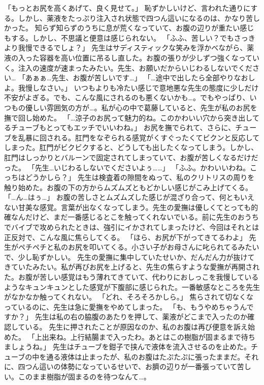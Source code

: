 「もっとお尻を高くあげて、良く見せて。」
恥ずかしいけど、言われた通りにする。しかし、薬液をたっぷり注入され状態で四つん這いになるのは、かなり苦しかった。
知らず知らずのうちに息が荒くなっていて、お腹の辺りが重たい感じもする。しかし、不思議と便意は感じられない。
「ふふ、苦しい？でもさっきより我慢できるでしょ？」
先生はサディスティックな笑みを浮かべながら、薬液の入った容器を高い位置に吊るし直した。お腹の張りが少しずつ強くなっていく。注入の速度が速まったみたい。先生、お願いだからいじわるしないでください…
「あぁぁ…先生、お腹が苦しいです…」
「…途中で出したら全部やりなおしよ。我慢しなさい。」
いつもよりも冷たい感じで意地悪な先生の態度に少しだけ不安がよぎる。でも、こんな風にされるのも悪くないかも…。でもやっぱり、いつもの優しい雰囲気の方が…。私が心の中で葛藤していると、先生が私のお尻を撫で回し始めた。
「…涼子のお尻って魅力的ね。このかわいい穴から突き出してるチューブもとってもエッチでいいわね。」
お尻を撫でられて、さらに、チューブを乱暴に回される。肛門をなぞられる感覚がくすぐったくてビクンと反応してしまった。肛門がビクビクすると、どうしても出したくなってしまう。しかし、肛門はしっかりとバルーンで固定されてしまっていて、お腹が苦しくなるだけだった。
「先生…いじわるしないでくださいよぅ……」
「ふふ。かわいいわね。こっちはどうかしら？」
先生は検査着の隙間をぬって、私のクリトリスの周りを触り始めた。お腹の下の方からムズムズともどかしい感じがこみ上げてくる。
「…ん…はぅ…」
お腹の苦しさとムズムズした感じが混ざり合って、何ともいえない甘美な感覚。言葉が出なくなってしまう。先生の愛撫は優しくてとっても的確なんだけど、まだ一番感じるとこを触ってくれないでいる。前に先生のおうちでバイブで攻められたときは、強引にイかされてしまったけど、今回はそれとは正反対で、こんな風に焦らしてくる。
「ほら、お尻が下がってきてるわよ」
先生がペチペチと私のお尻を叩いてくる。小さい子がお母さんに叱られてるみたいで、少し恥ずかしい。
先生の愛撫に集中していたせいか、だんだん力が抜けてきていたみたい。私が再びお尻を上げると、先生の焦らすような愛撫が再開された。お腹が苦しい感覚はもう薄れてきていて、代わりにおしっこを我慢しているようなキュンキュンとした感覚が下腹部に感じられた。一番敏感なところを先生がなかなか触ってくれない。
「どれ、そろそろかしら。」
焦らされて切なくなっているのに、先生は急に愛撫をやめてしまった。
「も、もうやめちゃうんですか？」
先生は私の右の脇腹のあたりを押して、薬液がどこまで入ったのか確認している。
先生に押されたことが原因なのか、私のお腹は再び便意を訴え始めた。
「上出来ね。上行結腸まで入ったわ。あとはこの樹脂が固まるまで待ちましょうね。」
先生はチューブを鉗子で挟んで液体を流入させるのを止めた。チューブの中を通る液体は止まったが、私のお腹はたぷたぷに張ったままだ。それに、四つん這いの体勢になっているせいで、お臍の辺りが一番張っていて苦しい。このまま樹脂が固まるのを待つなんて…。
